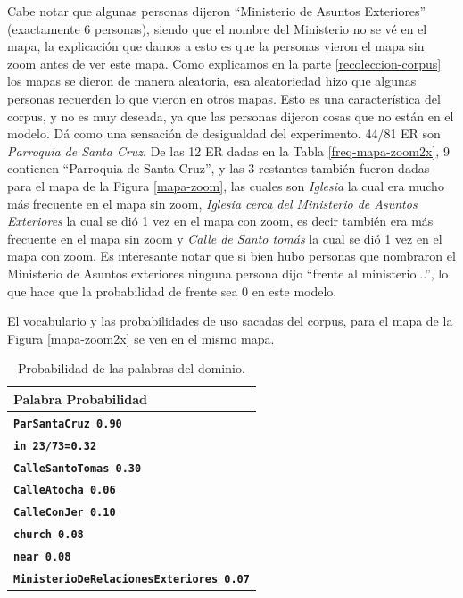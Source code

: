 Cabe notar que algunas personas dijeron ``Ministerio de Asuntos Exteriores'' (exactamente 6 personas), siendo que el nombre del Ministerio no se v\'e en el mapa, la 
explicaci\'on que damos a esto es que la personas vieron el mapa sin zoom antes de ver este mapa. Como explicamos en la parte \ref{recoleccion-corpus} los mapas se dieron de manera aleatoria, esa aleatoriedad hizo que algunas personas recuerden lo que vieron en otros mapas. Esto es una caracter\'istica del corpus, y no es muy deseada, ya que las personas dijeron cosas que no est\'an en el modelo. D\'a como una sensaci\'on de desigualdad del experimento.
44/81 ER son {\it Parroquia de Santa Cruz}. De las 12 ER dadas en la Tabla \ref{freq-mapa-zoom2x}, 9 contienen ``Parroquia de Santa Cruz'', y las 3 restantes tambi\'en fueron dadas
para el mapa de la Figura \ref{mapa-zoom}, las cuales son {\it Iglesia} la cual era mucho m\'as frecuente en el mapa sin zoom, {\it Iglesia cerca del Ministerio de Asuntos Exteriores} la cual se di\'o 1 vez en el mapa con zoom, es decir tambi\'en era m\'as frecuente en el mapa sin zoom y {\it Calle de Santo tom\'as} la cual se di\'o 1 vez en el mapa con zoom.
Es interesante notar que si bien hubo personas que nombraron el Ministerio de Asuntos exteriores ninguna persona dijo ``frente al ministerio...'', lo que hace que la probabilidad de frente sea 0 en este modelo.



El vocabulario y las probabilidades de uso sacadas del corpus, para el mapa de la Figura \ref{mapa-zoom2x} se ven en el mismo mapa.



\begin{table}[H]
\begin{small}
\begin{center}
\begin{tabular}{|l|}
\hline
Palabra                                             Probabilidad\\ \hline \hline
\textbf{\texttt{ParSantaCruz 0.90}}\\
\textbf{\texttt{in 23/73=0.32}}\\
\textbf{\texttt{CalleSantoTomas 0.30}}\\
\textbf{\texttt{CalleAtocha 0.06}}\\
\textbf{\texttt{CalleConJer 0.10}}\\
\textbf{\texttt{church 0.08}}\\
\textbf{\texttt{near 0.08}}\\
\textbf{\texttt{MinisterioDeRelacionesExteriores 0.07}}\\
\hline
\end{tabular}
\caption{Probabilidad de las palabras del dominio.}\label{prob-vocabulario-zoom}
\end{center}
\end{small}
\end{table}



